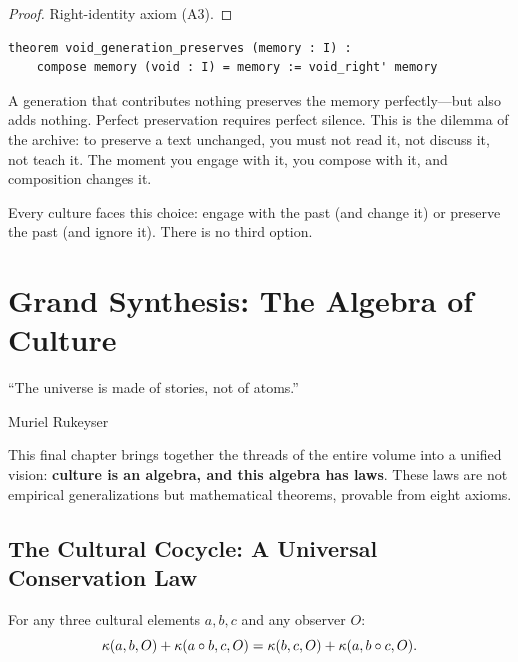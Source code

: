 \begin{proof}
Right-identity axiom (A3).
\end{proof}

\begin{lstlisting}
theorem void_generation_preserves (memory : I) :
    compose memory (void : I) = memory := void_right' memory
\end{lstlisting}

\begin{interpretation}
A generation that contributes nothing preserves the memory perfectly---but
also adds nothing.  Perfect preservation requires perfect silence.
This is the dilemma of the archive: to preserve a text unchanged, you
must not read it, not discuss it, not teach it.  The moment you engage
with it, you compose with it, and composition changes it.

Every culture faces this choice: engage with the past (and change it)
or preserve the past (and ignore it).  There is no third option.
\end{interpretation}



\chapter{Grand Synthesis: The Algebra of Culture}
\label{ch:synthesis}

\epigraph{``The universe is made of stories, not of atoms.''}{Muriel Rukeyser}

This final chapter brings together the threads of the entire volume into
a unified vision: \textbf{culture is an algebra, and this algebra has
laws}.  These laws are not empirical generalizations but mathematical
theorems, provable from eight axioms.

\section{The Cultural Cocycle: A Universal Conservation Law}

\begin{theorem}
\label{thm:cultural-cocycle}
For any three cultural elements $a, b, c$ and any observer $O$:
\[
  \kappa(a, b, O) + \kappa(a \circ b, c, O)
  = \kappa(b, c, O) + \kappa(a, b \circ c, O).
\]
\end{theorem}

